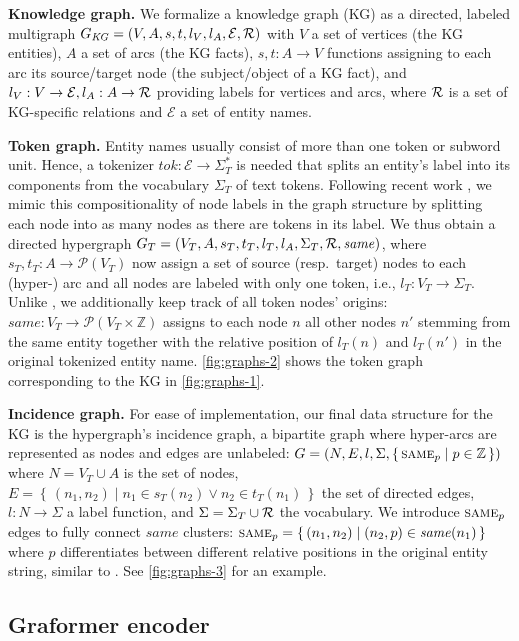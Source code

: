 \documentclass[11pt]{article}
\newcommand{\para}[1]{\noindent\textbf{#1.}}
\newcommand{\tuple}[1]{\ensuremath{\left(#1\right)}}
\newcommand{\powerset}[1]{\ensuremath{\mathcal{P}\left(#1\right)}}
\newcommand{\cset}[2]{\left\{\, #1 \mid #2 \,\right\}}
\newcommand{\Z}{\mathbb{Z}}
\newcommand{\entset}{\mathcal{E}}
\newcommand{\sameEnt}{\textsc{same}}
\newcommand{\same}{\ensuremath{\mathit{same}}}
\begin{document}
\para{Knowledge graph}
We formalize a knowledge graph (KG) as a directed, labeled multigraph
$G_\mathit{KG} = \tuple{V, A, s, t, l_V, l_A, \entset, \relset}$
with $V$ a set of vertices (the KG entities),
$A$ a set of arcs (the KG facts), $s, t : A \to V$ functions assigning to each arc its source/target node (the subject/object of a KG fact),
and $l_V : V \to \entset, l_A : A \to \relset$ providing labels for vertices and arcs,
where $\mathcal{R}$ is a set of KG-specific relations and $\entset$ a set of entity names.

\para{Token graph}
Entity names usually consist of more than one token or subword unit.
Hence, a tokenizer $\mathit{tok} : \entset \to \Sigma_T^*$ is
needed that
splits an entity's label into its components from the vocabulary $\Sigma_T$ of text tokens.
Following recent work \citep{ribeiro20},
we mimic this compositionality of node labels in the graph structure
by splitting each node into as many nodes as there are tokens in its label.
We thus obtain a directed hypergraph $G_T = \tuple{V_T, A, s_T, t_T, l_T, l_A, \Sigma_T, \relset, \same{}}$,
where $s_T, t_T : A \to \powerset{V_T}$ now assign a set of source (resp.\ target) nodes to each (hyper-) arc and all nodes are labeled with only one token,
i.e., $l_T : V_T \to \Sigma_T$.
Unlike \citet{ribeiro20},
we additionally keep track of all token nodes' origins:
$\same{} : V_T \to \powerset{V_T \times \Z}$ assigns to each node $n$ all other nodes $n'$ stemming from the same entity together with the relative position of $l_T(n)$ and $l_T(n')$ in the original tokenized entity name.
\cref{fig:graphs-2} shows the token graph corresponding  to the KG in \cref{fig:graphs-1}.

\para{Incidence graph}
For ease of implementation,
our final data structure for the KG is the hypergraph's incidence graph,
a bipartite graph where hyper-arcs are represented as nodes and edges are unlabeled:
$G = \tuple{N, E, l, \Sigma, \cset{\sameEnt{}_p}{p\in\Z}}$
where $N = V_T \cup A$ is the set of nodes,
$E = \cset{\tuple{n_1, n_2}}{n_1 \in s_T(n_2) \lor n_2 \in t_T(n_1)}$ the set of directed edges,
$l : N \to \Sigma$ a label function,
and $\Sigma = \Sigma_T \cup \mathcal{R}$ the vocabulary.
We introduce $\sameEnt{}_p$ edges to fully connect \same{} clusters:
$\sameEnt{}_p = \cset{\tuple{n_1, n_2}}{\tuple{n_2, p} \in \same{}(n_1)}$
where $p$ differentiates between different relative positions in the original entity string,
similar to \citep{shaw-etal-2018-self}.
See \cref{fig:graphs-3} for an example.


\subsection{Graformer encoder}
\label{sec:graph-encoder}
\end{document}

